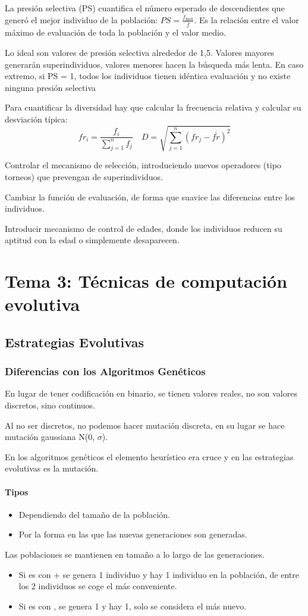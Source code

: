\documentclass[12pt, twoside, openright]{report} %
\begin{document}
La presión selectiva (PS) cuantifica el número esperado de descendientes que generó el mejor individuo de la población: $PS=\frac{f_{\max}}{\bar{f}}$. Es la relación entre el valor máximo de evaluación de toda la población y el valor medio.

Lo ideal son valores de presión selectiva alrededor de 1,5. Valores mayores generarán superindividuos, valores menores hacen la búsqueda más lenta. En caso extremo, si PS = 1, todos los individuos tienen idéntica evaluación y no existe ninguna presión selectiva

Para cuantificar la diversidad hay que calcular la frecuencia relativa y calcular su desviación típica:
$$fr_i=\frac{f_i}{\sum_{j=1}^n f_j} \quad D=\sqrt{\sum_{j=1}^n (fr_j-\bar{fr})^2}$$

Controlar el mecanismo de selección, introduciendo nuevos operadores (tipo torneos) que prevengan de superindividuos.

Cambiar la función de evaluación, de forma que suavice las diferencias entre los individuos.

Introducir mecanismo de control de edades, donde los individuos reducen su aptitud con la edad o simplemente desaparecen.

\chapter{Tema 3: Técnicas de computación evolutiva}
\section{Estrategias Evolutivas}

\subsection{Diferencias con los Algoritmos Genéticos}
En lugar de tener codificación en binario, se tienen valores reales, no son valores discretos, sino continuos.

Al no ser discretos, no podemos hacer mutación discreta, en su lugar se hace mutación gaussiana N(0, $\sigma$).

En los algoritmos genéticos el elemento heurístico era cruce y en las estrategias evolutivas es la mutación.

\subsubsection{Tipos}
\begin{itemize}
	\item Dependiendo del tamaño de la población.
	\item Por la forma en las que las nuevas generaciones son generadas.
\end{itemize}
Las poblaciones se mantienen en tamaño a lo largo de las generaciones.
\begin{itemize}
	\item Si es con + se genera 1 individuo y hay 1 individuo en la población, de entre los 2 individuos se coge el más conveniente.
	\item Si es con , se genera 1 y hay 1, solo se considera el más nuevo.
\end{itemize}
\end{document}
